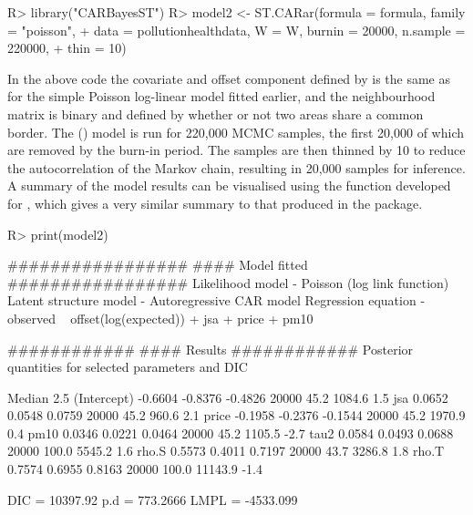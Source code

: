 \documentclass[article, nojss]{jss}
\begin{document}
\begin{CodeInput}
R>  library("CARBayesST")
R>  model2 <- ST.CARar(formula = formula, family = "poisson", 
+       data = pollutionhealthdata, W = W, burnin = 20000, n.sample = 220000, 
+       thin = 10)
\end{CodeInput}


In the above code the covariate and offset component defined by  is the same as for the simple Poisson log-linear model fitted earlier, and the neighbourhood matrix is binary and defined by whether or not two areas share a common border. The () model is run for 220,000 MCMC samples, the first 20,000 of which are removed by the burn-in period. The samples are then thinned by 10 to reduce the autocorrelation of the Markov chain, resulting in 20,000 samples for inference. A summary of the model results can be visualised using the  function developed for , which gives a very similar summary to that produced in the  package.

\begin{CodeInput}
R>  print(model2)
\end{CodeInput}


\begin{CodeOutput}
#################
#### Model fitted
#################
Likelihood model - Poisson (log link function) 
Latent structure model - Autoregressive CAR model
Regression equation - observed ~ offset(log(expected)) + jsa + price + pm10

############
#### Results
############
Posterior quantities for selected parameters and DIC

             Median    2.5%
(Intercept) -0.6604 -0.8376 -0.4826    20000     45.2      1084.6         1.5
jsa          0.0652  0.0548  0.0759    20000     45.2       960.6         2.1
price       -0.1958 -0.2376 -0.1544    20000     45.2      1970.9         0.4
pm10         0.0346  0.0221  0.0464    20000     45.2      1105.5        -2.7
tau2         0.0584  0.0493  0.0688    20000    100.0      5545.2         1.6
rho.S        0.5573  0.4011  0.7197    20000     43.7      3286.8         1.8
rho.T        0.7574  0.6955  0.8163    20000    100.0     11143.9        -1.4

DIC =  10397.92       p.d =  773.2666       LMPL =  -4533.099 
\end{CodeOutput}
\end{document}

